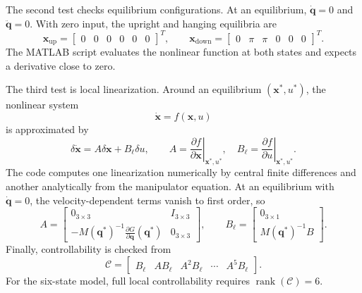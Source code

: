 \documentclass[11pt,a4paper]{article}
\begin{document}
The second test checks equilibrium configurations. At an equilibrium, $\dot{\bm q}=0$ and $\ddot{\bm q}=0$. With zero input, the upright and hanging equilibria are
\begin{equation}
    \bm x_{\mathrm{up}}=
    \begin{bmatrix}0&0&0&0&0&0\end{bmatrix}^{T},
    \qquad
    \bm x_{\mathrm{down}}=
    \begin{bmatrix}0&\pi&\pi&0&0&0\end{bmatrix}^{T}.
\end{equation}
The MATLAB script evaluates the nonlinear function at both states and expects a derivative close to zero.

The third test is local linearization. Around an equilibrium $(\bm x^\ast,u^\ast)$, the nonlinear system
\begin{equation}
    \dot{\bm x}=f(\bm x,u)
\end{equation}
is approximated by
\begin{equation}
    \delta\dot{\bm x}=A\delta\bm x+B_\ell\delta u,
    \qquad
    A=\left.\frac{\partial f}{\partial \bm x}\right|_{\bm x^\ast,u^\ast},
    \quad
    B_\ell=\left.\frac{\partial f}{\partial u}\right|_{\bm x^\ast,u^\ast}.
\end{equation}
The code computes one linearization numerically by central finite differences and another analytically from the manipulator equation. At an equilibrium with $\dot{\bm q}=0$, the velocity-dependent terms vanish to first order, so
\begin{equation}
    A=
    \begin{bmatrix}
        0_{3\times3} & I_{3\times3}\\
        -M(\bm q^\ast)^{-1}\frac{\partial G}{\partial \bm q}(\bm q^\ast) & 0_{3\times3}
    \end{bmatrix},
    \qquad
    B_\ell=
    \begin{bmatrix}
        0_{3\times1}\\
        M(\bm q^\ast)^{-1}B
    \end{bmatrix}.
\end{equation}
Finally, controllability is checked from
\begin{equation}
    \mathcal{C}=
    \begin{bmatrix}
        B_\ell & AB_\ell & A^2B_\ell & \cdots & A^5B_\ell
    \end{bmatrix}.
\end{equation}
For the six-state model, full local controllability requires $\operatorname{rank}(\mathcal{C})=6$.
\end{document}

